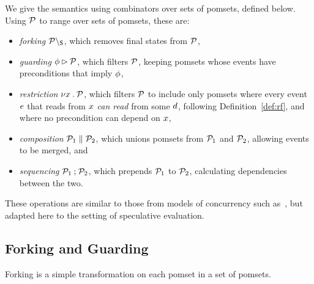 We give the semantics using combinators over sets of pomsets, defined below.
Using $\mathcal{P}$ to range over sets of pomsets, these are:
\begin{itemize}
\item \emph{forking} $\mathcal{P}\setminus_{\mathsf{S}}$, which removes final states from
  $\mathcal{P}$, 
\item \emph{guarding} $\phi\mathbin\rhd\mathcal{P}$, which filters $\mathcal{P}$,
  keeping pomsets whose events have preconditions that imply $\phi$,
\item \emph{restriction} $\nu x\mathbin.\mathcal{P}$, which filters $\mathcal{P}$ to include
  only pomsets where every event $e$ that reads from $x$ \emph{can read} from some
  $d$, following Definition~\ref{def:rf},
  and where no precondition can depend on $x$,
\item \emph{composition} $\mathcal{P}_1\parallel\mathcal{P}_2$, which unions pomsets from
  $\mathcal{P}_1$ and $\mathcal{P}_2$, allowing events to be merged, and
\item \emph{sequencing} $\mathcal{P}_1\mathbin;\mathcal{P}_2$, which prepends
  $\mathcal{P}_1$ to $\mathcal{P}_2$, calculating dependencies between the two.
\end{itemize}
These operations are similar to those from models of concurrency such
as~\cite{Brookes:1984:TCS:828.833}, but adapted here to the setting of
speculative evaluation.







\subsection{Forking and Guarding} %

Forking is %
a simple transformation on each pomset
in a set of pomsets.

